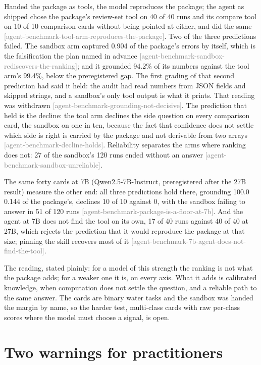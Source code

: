 \documentclass[11pt,a4paper]{article}
\newcommand{\claim}[1]{{\scriptsize\textsf{\textcolor{gray}{[#1]}}}}
\begin{document}
Handed the package as tools, the model reproduces the package; the agent as
shipped chose the package's review-set tool on 40 of 40 runs and its compare
tool on 10 of 10 comparison cards without being pointed at either, and did the
same \claim{agent-benchmark-tool-arm-reproduces-the-package}. Two of the three
predictions failed. The sandbox arm captured 0.904 of the package's errors by
itself, which is the falsification the plan named in advance
\claim{agent-benchmark-sandbox-rediscovers-the-ranking}; and it grounded 94.2\%
of its numbers against the tool arm's 99.4\%, below the preregistered gap. The
first grading of that second prediction had said it held: the audit had read
numbers from JSON fields and skipped strings, and a sandbox's only tool output is
what it prints. That reading was withdrawn \claim{agent-benchmark-grounding-not-decisive}.
The prediction that held is the decline: the tool arm declines the side question
on every comparison card, the sandbox on one in ten, because the fact that
confidence does not settle which side is right is carried by the package and not
derivable from two arrays \claim{agent-benchmark-decline-holds}. Reliability
separates the arms where ranking does not: 27 of the sandbox's 120 runs ended
without an answer \claim{agent-benchmark-sandbox-unreliable}.

The same forty cards at 7B (Qwen2.5-7B-Instruct, preregistered after the 27B
result) measure the other end: all three predictions hold there, grounding
100.0%
0.144 of the package's, declines 10 of 10 against 0, with the sandbox failing to
answer in 51 of 120 runs \claim{agent-benchmark-package-is-a-floor-at-7b}. And the
agent at 7B does not find the tool on its own, 17 of 40 runs against 40 of 40 at
27B, which rejects the prediction that it would reproduce the package at that size;
pinning the skill recovers most of it \claim{agent-benchmark-7b-agent-does-not-find-the-tool}.

The reading, stated plainly: for a model of this strength the ranking is not what
the package adds; for a weaker one it is, on every axis. What it adds is calibrated knowledge, when computation does not
settle the question, and a reliable path to the same answer. The cards are binary
water tasks and the sandbox was handed the margin by name, so the harder test,
multi-class cards with raw per-class scores where the model must choose a
signal, is open.

\section{Two warnings for practitioners}
\end{document}
